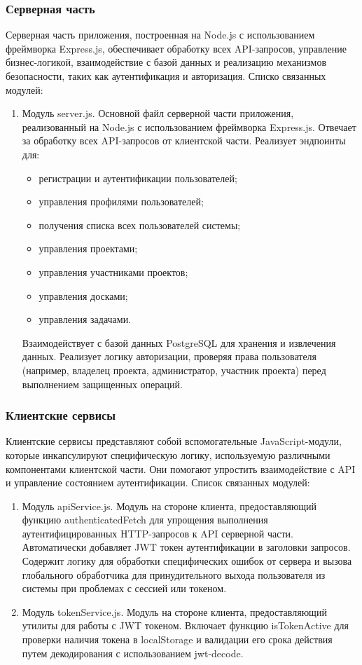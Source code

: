 \subsubsection{Серверная часть}
Серверная часть приложения, построенная на Node.js с использованием фреймворка Express.js, обеспечивает обработку всех API-запросов, управление бизнес-логикой, взаимодействие с базой данных и реализацию механизмов безопасности, таких как аутентификация и авторизация. Списко связанных модулей:
\begin{enumerate}
	\item Модуль server.js. Основной файл серверной части приложения, реализованный на Node.js с использованием фреймворка Express.js. Отвечает за обработку всех API-запросов от клиентской части. Реализует эндпоинты для:
	\begin{itemize}
		\item регистрации и аутентификации пользователей;
		\item управления профилями пользователей;
		\item получения списка всех пользователей системы;
		\item управления проектами;
		\item управления участниками проектов;
		\item управления досками;
		\item управления задачами.
	\end{itemize}
	Взаимодействует с базой данных PostgreSQL для хранения и извлечения данных. Реализует логику авторизации, проверяя права пользователя (например, владелец проекта, администратор, участник проекта) перед выполнением защищенных операций.
\end{enumerate}

\subsubsection{Клиентские сервисы}
Клиентские сервисы представляют собой вспомогательные JavaScript-модули, которые инкапсулируют специфическую логику, используемую различными компонентами клиентской части. Они помогают упростить взаимодействие с API и управление состоянием аутентификации. Список связанных модулей:
\begin{enumerate}
	\item Модуль apiService.js. Модуль на стороне клиента, предоставляющий функцию authenticatedFetch для упрощения выполнения аутентифицированных HTTP-запросов к API серверной части. Автоматически добавляет JWT токен аутентификации в заголовки запросов. Содержит логику для обработки специфических ошибок от сервера и вызова глобального обработчика для принудительного выхода пользователя из системы при проблемах с сессией или токеном.
	\item Модуль tokenService.js. Модуль на стороне клиента, предоставляющий утилиты для работы с JWT токеном. Включает функцию isTokenActive для проверки наличия токена в localStorage и валидации его срока действия путем декодирования с использованием jwt-decode.
\end{enumerate}

